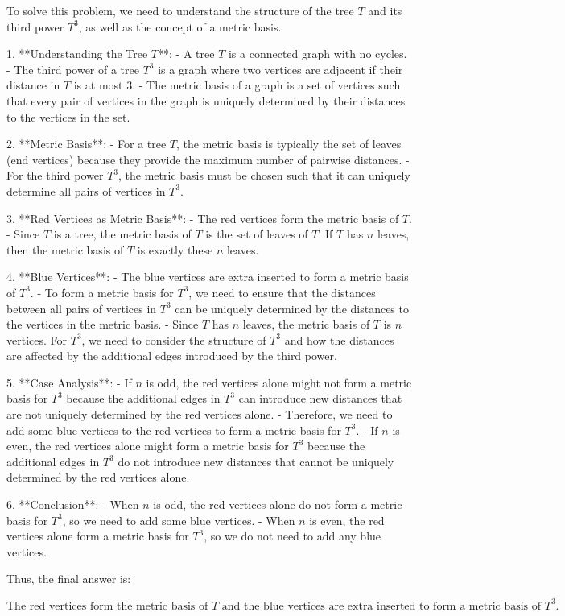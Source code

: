 To solve this problem, we need to understand the structure of the tree \( T \) and its third power \( T^3 \), as well as the concept of a metric basis.

1. **Understanding the Tree \( T \)**:
   - A tree \( T \) is a connected graph with no cycles.
   - The third power of a tree \( T^3 \) is a graph where two vertices are adjacent if their distance in \( T \) is at most 3.
   - The metric basis of a graph is a set of vertices such that every pair of vertices in the graph is uniquely determined by their distances to the vertices in the set.

2. **Metric Basis**:
   - For a tree \( T \), the metric basis is typically the set of leaves (end vertices) because they provide the maximum number of pairwise distances.
   - For the third power \( T^3 \), the metric basis must be chosen such that it can uniquely determine all pairs of vertices in \( T^3 \).

3. **Red Vertices as Metric Basis**:
   - The red vertices form the metric basis of \( T \).
   - Since \( T \) is a tree, the metric basis of \( T \) is the set of leaves of \( T \). If \( T \) has \( n \) leaves, then the metric basis of \( T \) is exactly these \( n \) leaves.

4. **Blue Vertices**:
   - The blue vertices are extra inserted to form a metric basis of \( T^3 \).
   - To form a metric basis for \( T^3 \), we need to ensure that the distances between all pairs of vertices in \( T^3 \) can be uniquely determined by the distances to the vertices in the metric basis.
   - Since \( T \) has \( n \) leaves, the metric basis of \( T \) is \( n \) vertices. For \( T^3 \), we need to consider the structure of \( T^3 \) and how the distances are affected by the additional edges introduced by the third power.

5. **Case Analysis**:
   - If \( n \) is odd, the red vertices alone might not form a metric basis for \( T^3 \) because the additional edges in \( T^3 \) can introduce new distances that are not uniquely determined by the red vertices alone.
   - Therefore, we need to add some blue vertices to the red vertices to form a metric basis for \( T^3 \).
   - If \( n \) is even, the red vertices alone might form a metric basis for \( T^3 \) because the additional edges in \( T^3 \) do not introduce new distances that cannot be uniquely determined by the red vertices alone.

6. **Conclusion**:
   - When \( n \) is odd, the red vertices alone do not form a metric basis for \( T^3 \), so we need to add some blue vertices.
   - When \( n \) is even, the red vertices alone form a metric basis for \( T^3 \), so we do not need to add any blue vertices.

Thus, the final answer is:

\[
\boxed{\text{The red vertices form the metric basis of } T \text{ and the blue vertices are extra inserted to form a metric basis of } T^3.}
\]